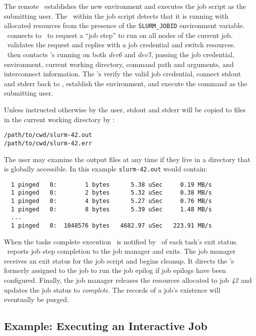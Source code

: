 The remote \slurmd\ establishes the new environment and executes the
job script as the submitting user. The \srun\ within the job script
detects that it is running with allocated resources from the presence
of the {\tt SLURM\_JOBID} environment variable. \srun\ connects to
\slurmctld\ to request a ``job step'' to run on all nodes of the current
job. \slurmctld\ validates the request and replies with a job credential
and switch resources. \srun\ then contacts \slurmd 's running on both
{\em dev6} and {\em dev7}, passing the job credential, environment,
current working directory, command path and arguments, and interconnect
information. The \slurmd 's verify the valid job credential, connect
stdout and stderr back to \srun , establish the environment, and execute
the command as the submitting user.

Unless instructed otherwise by the user, stdout and stderr will be
copied to files in the current working directory by \srun :

\begin{verbatim}
/path/to/cwd/slurm-42.out
/path/to/cwd/slurm-42.err
\end{verbatim}

The user may examine the output files at any time if they live
in a directory that is globally accessible. In this example
{\tt slurm-42.out} would  contain:

\begin{verbatim}
  1 pinged   0:        1 bytes      5.38 uSec     0.19 MB/s                     
  1 pinged   0:        2 bytes      5.32 uSec     0.38 MB/s                     
  1 pinged   0:        4 bytes      5.27 uSec     0.76 MB/s                     
  1 pinged   0:        8 bytes      5.39 uSec     1.48 MB/s                     
  ...
  1 pinged   0:  1048576 bytes   4682.97 uSec   223.91 MB/s              
\end{verbatim}

When the tasks complete execution \srun\ is notified by \slurmd\ of each
task's exit status. \srun\ reports job step completion to the job manager
and exits. The job manager receives an exit status for the job script
and begins cleanup. It directs the \slurmd 's formerly assigned to the
job to run the job epilog if job epilogs have been configured. Finally,
the job manager releases the resources allocated to job {\em 42}
and updates the job status to {\em complete}. The records of a job's
existence will eventually be purged.

\subsection{Example:  Executing an Interactive Job}

